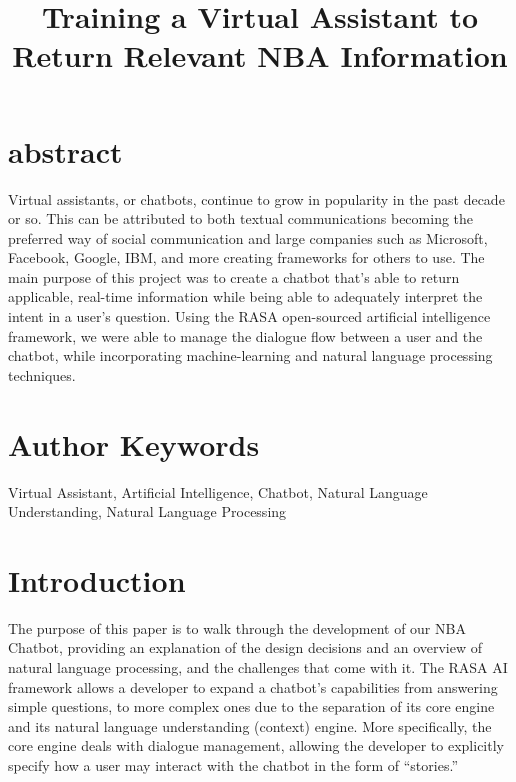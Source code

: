 \documentclass[conference]{IEEEtran}
\begin{document}
\title{Training a Virtual Assistant to Return Relevant NBA Information\\
}

\author{
\and
{}
\and
{}
}

\maketitle

\section*{abstract}
Virtual assistants, or chatbots, continue to grow in popularity in the past decade or so. This can be attributed to both textual communications becoming the preferred way of social communication and large companies such as Microsoft, Facebook, Google, IBM, and more creating frameworks for others to use. The main purpose of this project was to create a chatbot that’s able to return applicable, real-time information while being able to adequately interpret the intent in a user’s question. Using the RASA open-sourced artificial intelligence framework, we were able to manage the dialogue flow between a user and the chatbot, while incorporating machine-learning and natural language processing techniques.

\section*{Author Keywords}
Virtual Assistant, Artificial Intelligence, Chatbot, Natural Language Understanding, Natural Language Processing

\section*{Introduction}
The purpose of this paper is to walk through the development of our NBA Chatbot, providing an explanation of the design decisions and an overview of natural language processing, and the challenges that come with it. The RASA AI framework allows a developer to expand a chatbot’s capabilities from answering simple questions, to more complex ones due to the separation of its core engine and its natural language understanding (context) engine. More specifically, the core engine deals with dialogue management, allowing the developer to explicitly specify how a user may interact with the chatbot in the form of “stories.” 
\end{document}
